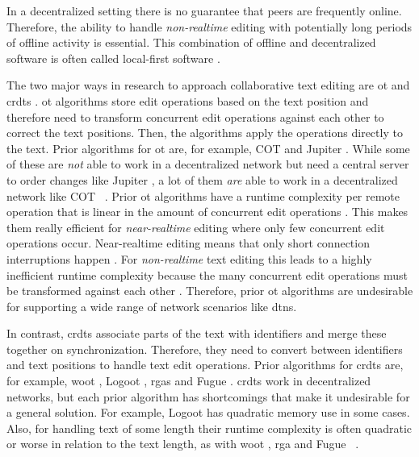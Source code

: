 In a decentralized setting there is no guarantee that peers are frequently online. Therefore, the ability to handle \textit{non-realtime} editing with potentially long periods of offline activity is essential. This combination of offline and decentralized software is often called local-first software \cite{2019-kleppmann-local-first}.

The two major ways in research to approach collaborative text editing are \gls{ot} and \glspl{crdt} \cite[page 2]{2019-sun-difference-ot-crdt-1-general-transformation-framework}. \gls{ot} algorithms store edit operations based on the text position and therefore need to transform concurrent edit operations against each other to correct the text positions. Then, the algorithms apply the operations directly to the text.
Prior algorithms for \gls{ot} are, for example, COT \cite{2009-sun-ot-context-undo} and Jupiter \cite{1995-nichols-jupiter}. While some of these are \textit{not} able to work in a decentralized network but need a central server to order changes like Jupiter \cite{1995-nichols-jupiter}, a lot of them \textit{are} able to work in a decentralized network like COT \cite{2009-sun-ot-context-undo}~\cite[Section 4]{2019-sun-difference-ot-crdt-3-building-real-world-applications}. Prior \gls{ot} algorithms have a runtime complexity per remote operation that is linear in the amount of concurrent edit operations \cite[Section 3.1.4]{2019-sun-difference-ot-crdt-2-correctness-complexity}. This makes them really efficient for \textit{near-realtime} editing where only few concurrent edit operations occur. Near-realtime editing means that only short connection interruptions happen \cite{2016-yata-yjs}. For \textit{non-realtime} text editing this leads to a highly inefficient runtime complexity because the many concurrent edit operations must be transformed against each other \cite[Section 1]{2019-sun-difference-ot-crdt-3-building-real-world-applications}. Therefore, prior \gls{ot} algorithms are undesirable for supporting a wide range of network scenarios like \glspl{dtn}.

In contrast, \glspl{crdt} associate parts of the text with identifiers and merge these together on synchronization. Therefore, they need to convert between identifiers and text positions to handle text edit operations. Prior algorithms for \glspl{crdt} are, for example, \gls{woot} \cite{2006-oster-woot}, Logoot \cite{2009-weiss-logoot}, \glspl{rga} \cite{2011-roh-rga} and Fugue \cite{2023-weidner-minimizing-interleaving}. \glspl{crdt} work in decentralized networks, but each prior algorithm has shortcomings that make it undesirable for a general solution. For example, Logoot \cite{2009-weiss-logoot} has quadratic memory use in some cases. Also, for handling text of some length their runtime complexity is often quadratic or worse in relation to the text length, as with \gls{woot} \cite{2006-oster-woot}, \gls{rga} \cite{2011-roh-rga} and Fugue \cite{2023-weidner-minimizing-interleaving}~\cite[Section 5.3]{2019-sun-difference-ot-crdt-1-general-transformation-framework}.

